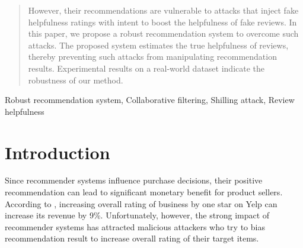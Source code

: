\documentclass[master,english,final]{kaist-ucs}
\begin{document}
\begin{abstract}
    However, their recommendations are vulnerable to attacks that inject fake helpfulness ratings with intent to boost the helpfulness of fake reviews.
    In this paper, we propose a robust recommendation system to overcome such attacks.
    The proposed system estimates the true helpfulness of reviews, thereby preventing such attacks from manipulating recommendation results.
    Experimental results on a real-world dataset indicate the robustness of our method.


    \end{abstract}

    \begin{Engkeyword}
    Robust recommendation system, Collaborative filtering, Shilling attack, Review helpfulness
    \end{Engkeyword}





    \tableofcontents

    \listoftables

    \listoffigures



\chapter{Introduction}

Since recommender systems influence purchase decisions, their positive recommendation can lead to significant monetary benefit for product sellers.
According to \cite{yelp_study} , increasing overall rating of business by one star on Yelp can increase its revenue by 9\%.
Unfortunately, however, the strong impact of recommender systems has attracted malicious attackers who try to bias recommendation result to increase overall rating of their target items.
\end{document}
